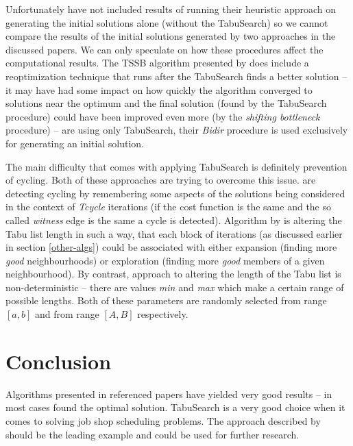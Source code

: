 \documentclass[14pt]{article}
\begin{document}
Unfortunately \citet{pezzella} have not included results of running their heuristic approach on generating the initial solutions alone (without the TabuSearch) so we cannot compare the results of the initial solutions generated by two approaches in the discussed papers. We can only speculate on how these procedures affect the computational results. The TSSB algorithm presented by \citet{pezzella} does include a reoptimization technique that runs after the TabuSearch finds a better solution – it may have had some impact on how quickly the algorithm converged to solutions near the optimum and the final solution (found by the TabuSearch procedure) could have been improved even more (by the \textit{shifting bottleneck} procedure) – \citet{amico-trubian} are using only TabuSearch, their \textit{Bidir} procedure is used exclusively for generating an initial solution.

The main difficulty that comes with applying TabuSearch is definitely prevention of cycling. Both of these approaches are trying to overcome this issue. \citet{amico-trubian} are detecting cycling by remembering some aspects of the solutions being considered in the context of \textit{Tcycle} iterations (if the cost function is the same and the so called \textit{witness} edge is the same a cycle is detected). Algorithm by \citet{pezzella} is altering the Tabu list length in such a way, that each block of iterations (as discussed earlier in section \ref{other-algs}) could be associated with either expansion (finding more \textit{good} neighbourhoods) or exploration (finding more \textit{good} members of a given neighbourhood). By contrast, \citet{amico-trubian} approach to altering the length of the Tabu list is non-deterministic – there are values \textit{min} and \textit{max} which make a certain range of possible lengths. Both of these parameters are randomly selected from range $[a,b]$ and from range $[A,B]$ respectively.

\section{Conclusion}

Algorithms presented in referenced papers have yielded very good results – in most cases found the optimal solution. TabuSearch is a very good choice when it comes to solving job shop scheduling problems. The approach described by \citet{pezzella} should be the leading example and could be used for further research.

\clearpage


\end{document}
